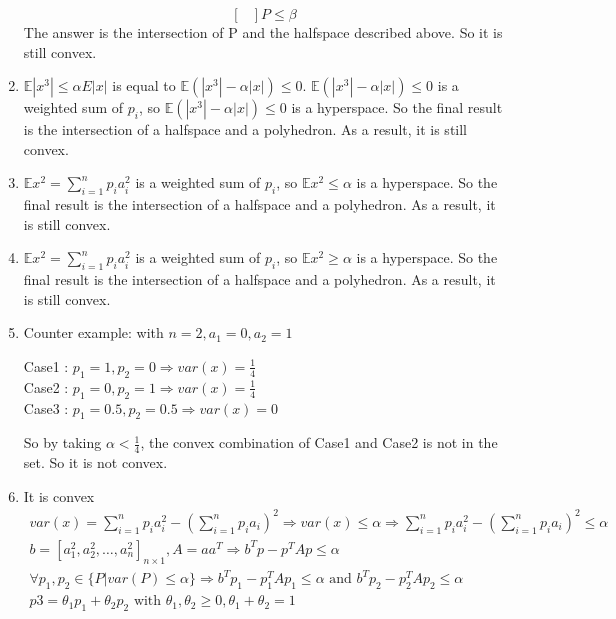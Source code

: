 \documentclass[a4paper]{article}
\begin{document}
\begin{latin}
\begin{enumerate}
\begin{equation*}
\begin{bmatrix}
		\end{bmatrix}  P \leq \beta
	\end{equation*}
	The answer is the intersection of P and the halfspace described above. So it is still convex.
	\item $ \mathbb{E} |x^{3}| \leq \alpha E |x| $ is equal to $ \mathbb{E} (|x^{3}|-\alpha|x|) \leq 0 $. $ \mathbb{E} (|x^{3}|-\alpha|x|) \leq 0 $ is a weighted sum of $  p_{i} $, so  $ \mathbb{E} (|x^{3}|-\alpha|x|) \leq 0 $ is a hyperspace. So the final result is the intersection of a halfspace and a polyhedron. As a result, it is still convex.  
	\item  $ \mathbb{E}x^{2} = \sum_{i=1}^{n} p_{i} a_{i}^{2} $ is a weighted sum of $  p_{i} $, so $ \mathbb{E}x^{2} \leq \alpha $ is a hyperspace. So the final result is the intersection of a halfspace and a polyhedron. As a result, it is still convex. 
	\item  $ \mathbb{E}x^{2} = \sum_{i=1}^{n} p_{i} a_{i}^{2} $ is a weighted sum of $  p_{i} $, so $ \mathbb{E}x^{2} \geq \alpha $ is a hyperspace. So the final result is the intersection of a halfspace and a polyhedron. As a result, it is still convex. 
	\item  Counter example: with $ n=2, a_{1}=0, a_{2}=1 $ 
	\begin{center}
		Case1 : $ p_{1}=1, p_{2}=0 \Rightarrow var(x) = \frac{1}{4} $ \\
		Case2 : $ p_{1}=0, p_{2}=1 \Rightarrow var(x) = \frac{1}{4} $ \\
		Case3 : $ p_{1}=0.5, p_{2}=0.5 \Rightarrow var(x) = 0 $
	\end{center}
	So by taking $ \alpha < \frac{1}{4} $, the convex combination of Case1 and Case2 is not in the set. So it is not convex.
	\item  It is convex
	\begin{gather*}
		var(x) = \sum_{i=1}^{n} p_{i} a_{i}^{2} - (\sum_{i=1}^{n} p_{i} a_{i})^{2} \Rightarrow var(x) \leq \alpha \Rightarrow \sum_{i=1}^{n} p_{i} a_{i}^{2} - (\sum_{i=1}^{n} p_{i} a_{i})^{2} \leq \alpha
		\\
		b = [a_{1}^{2}, a_{2}^{2}, \dots, a_{n}^{2}]_{n \times 1}, A = a a^{T} \Rightarrow b^{T}p - p^{T} A p \leq \alpha
		\\
		\forall p_{1},p_{2} \in \{P | var(P) \leq \alpha \} \Rightarrow b^{T}p_{1} - p_{1}^{T} A p_{1} \leq \alpha \text{ and } b^{T}p_{2} - p_{2}^{T} A p_{2} \leq \alpha
		\\
		p3 = \theta_{1}p_{1} + \theta_{2}p_{2} \text{ with } \theta_{1},\theta_{2} \geq 0, \theta_{1}+\theta_{2} = 1

\end{gather*}
\end{enumerate}
\end{latin}
\end{document}
